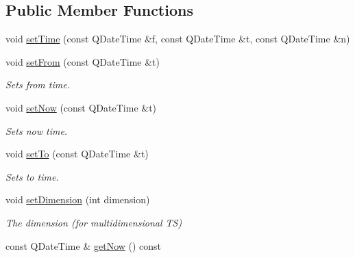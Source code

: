 \subsection*{Public Member Functions}
\begin{DoxyCompactItemize}
\item 
void \hyperlink{classGKContext_a2b98b38dd875e956e803b0d0aa0c9290}{set\+Time} (const Q\+Date\+Time \&f, const Q\+Date\+Time \&t, const Q\+Date\+Time \&n)
\item 
void \hyperlink{classGKContext_a85453edb25ba1f029445f1ba44557fd4}{set\+From} (const Q\+Date\+Time \&t)\hypertarget{classGKContext_a85453edb25ba1f029445f1ba44557fd4}{}\label{classGKContext_a85453edb25ba1f029445f1ba44557fd4}

\begin{DoxyCompactList}\small\item\em Sets \textquotesingle{}from\textquotesingle{} time. \end{DoxyCompactList}\item 
void \hyperlink{classGKContext_ab6a23360ba0074e759c01efcf5e622f4}{set\+Now} (const Q\+Date\+Time \&t)\hypertarget{classGKContext_ab6a23360ba0074e759c01efcf5e622f4}{}\label{classGKContext_ab6a23360ba0074e759c01efcf5e622f4}

\begin{DoxyCompactList}\small\item\em Sets \textquotesingle{}now\textquotesingle{} time. \end{DoxyCompactList}\item 
void \hyperlink{classGKContext_a576fc89f848018e986374d72066c1c96}{set\+To} (const Q\+Date\+Time \&t)\hypertarget{classGKContext_a576fc89f848018e986374d72066c1c96}{}\label{classGKContext_a576fc89f848018e986374d72066c1c96}

\begin{DoxyCompactList}\small\item\em Sets \textquotesingle{}to\textquotesingle{} time. \end{DoxyCompactList}\item 
void \hyperlink{classGKContext_a50e6d719d8b76e98d3124426018dfb83}{set\+Dimension} (int dimension)\hypertarget{classGKContext_a50e6d719d8b76e98d3124426018dfb83}{}\label{classGKContext_a50e6d719d8b76e98d3124426018dfb83}

\begin{DoxyCompactList}\small\item\em The dimension (for multidimensional TS) \end{DoxyCompactList}\item 
const Q\+Date\+Time \& \hyperlink{classGKContext_a8257441688f38f9a6108a523a427f8b0}{get\+Now} () const \hypertarget{classGKContext_a8257441688f38f9a6108a523a427f8b0}{}\label{classGKContext_a8257441688f38f9a6108a523a427f8b0}


\end{DoxyCompactItemize}
